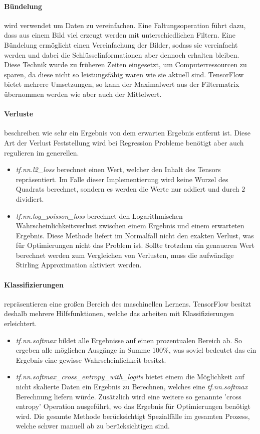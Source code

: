 \paragraph{Bündelung} wird verwendet um Daten zu vereinfachen. 
Eine Faltungsoperation führt dazu, dass aus einem Bild viel erzeugt werden mit unterschiedlichen Filtern. 
Eine Bündelung ermöglicht einen Vereinfachung der Bilder, sodass sie vereinfacht werden und dabei die Schlüsselinformationen aber dennoch erhalten bleiben. 
Diese Technik wurde zu früheren Zeiten eingesetzt, um Computerressourcen zu sparen, da diese nicht so leistungsfähig waren wie sie aktuell sind. 
TensorFlow bietet mehrere Umsetzungen, so kann der Maximalwert aus der Filtermatrix übernommen werden wie aber auch der Mittelwert. 

\paragraph{Verluste} beschreiben wie sehr ein Ergebnis von dem erwarten Ergebnis entfernt ist. 
Diese Art der Verlust Feststellung wird bei Regression Probleme benötigt aber auch regulieren im generellen.
\begin{itemize}
	\item \textit{tf.nn.l2\_loss} berechnet einen Wert, welcher den Inhalt des Tensors repräsentiert. 
	Im Falle dieser Implementierung wird keine Wurzel des Quadrats berechnet, sondern es werden die Werte nur addiert und durch $2$ dividiert.
	\item \textit{tf.nn.log\_poisson\_loss} berechnet den Logarithmischen-Wahrscheinlichkeitsverlust zwischen einem Ergebnis und einem erwarteten Ergebnis. 
	Diese Methode liefert im Normalfall nicht den exakten Verlust, was für Optimierungen nicht das Problem ist. 
	Sollte trotzdem ein genaueren Wert berechnet werden zum Vergleichen von Verlusten, muss die aufwändige Stirling Approximation aktiviert werden. 
\end{itemize}

\paragraph{Klassifizierungen} repräsentieren eine großen Bereich des maschinellen Lernens. 
TensorFlow besitzt deshalb mehrere Hilfsfunktionen, welche das arbeiten mit Klassifizierungen erleichtert. 
\begin{itemize}
	\item \textit{tf.nn.softmax} bildet alle Ergebnisse auf einen prozentualen Bereich ab. 
	So ergeben alle möglichen Ausgänge in Summe 100\%, was soviel bedeutet das ein Ergebnis eine gewisse Wahrscheinlichkeit besitzt. 
	\item \textit{tf.nn.softmax\_cross\_entropy\_with\_logits} bietet einem die Möglichkeit auf nicht skalierte Daten ein Ergebnis zu Berechnen, welches eine \textit{tf.nn.softmax} Berechnung liefern würde. 
	Zusätzlich wird eine weitere so genannte 'cross entropy' Operation ausgeführt, wo das Ergebnis für Optimierungen benötigt wird. 
	Die gesamte Methode berücksichtigt Spezialfälle im gesamten Prozess, welche schwer manuell ab zu berücksichtigen sind. 
\end{itemize}

